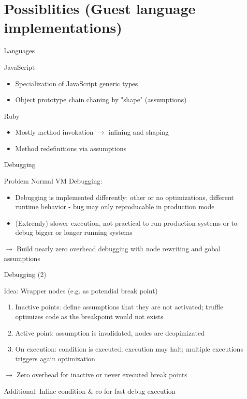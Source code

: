 \documentclass[xcolor=dvipsname,handout]{beamer} %
\newcommand{\idea}[1]{$\rightarrow$ #1}
\begin{document}
\section{Possiblities (Guest language implementations)}

\begin{frame}{Languages}
  \begin{block}{JavaScript}
    \begin{itemize}
      \item Specialization of JavaScript generic types
      \item Object prototype chain chaning by "shape" (assumptions)
    \end{itemize}
  \end{block}
  \begin{block}{Ruby}
    \begin{itemize}
      \item Mostly method invokation $\rightarrow$ inlining and shaping
      \item Method redefinitions via assumptions
    \end{itemize}
  \end{block}
\end{frame}

\begin{frame}{Debugging}
  \begin{alertblock}{Problem}
  Normal VM Debugging:
    \begin{itemize}
      \item Debugging is implemented differently: other or no optimizations, different runtime behavior - bug may only reproducable in production mode
      \item (Extremly) slower execution, not practical to run production systems or to debug bigger or longer running systems
    \end{itemize}
  \end{alertblock}
  
  \idea{Build nearly zero overhead debugging with node rewriting and gobal assumptions}
\end{frame}


\begin{frame}{Debugging (2)}

Idea: Wrapper nodes (e.g. as potendial break point)

\begin{enumerate}
 \item Inactive points: define assumptions that they are not activated; truffle optimizes code as the breakpoint would not exists
 \item Active point: assumption is invalidated, nodes are deopimizated
 \item On execution: condition is executed, execution may halt; multiple executions triggers again optimization
\end{enumerate}

\idea{Zero overhead for inactive or never executed break points}

\vspace{.3cm}

Additional: Inline condition \& co for fast debug execution
\end{frame}
\end{document}
